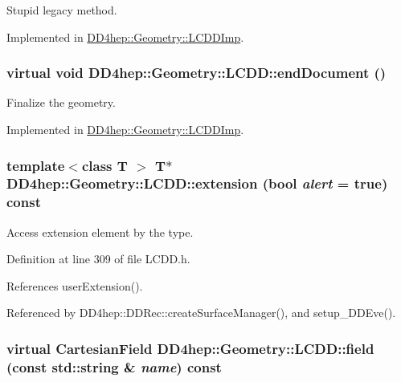 Stupid legacy method. 

Implemented in \hyperlink{class_d_d4hep_1_1_geometry_1_1_l_c_d_d_imp_ad50f1540a6b3d99e049e1e4a91eabf8a}{DD4hep::Geometry::LCDDImp}.\hypertarget{class_d_d4hep_1_1_geometry_1_1_l_c_d_d_abe2147b8363040ce95bb40f810d95b36}{
\subsubsection[{endDocument}]{\setlength{\rightskip}{0pt plus 5cm}virtual void DD4hep::Geometry::LCDD::endDocument ()}}
\label{class_d_d4hep_1_1_geometry_1_1_l_c_d_d_abe2147b8363040ce95bb40f810d95b36}


Finalize the geometry. 

Implemented in \hyperlink{class_d_d4hep_1_1_geometry_1_1_l_c_d_d_imp_aa3fa37aa7608b67f95aa644dc381389f}{DD4hep::Geometry::LCDDImp}.\hypertarget{class_d_d4hep_1_1_geometry_1_1_l_c_d_d_aac5486912a4f88cbad59f6e0ec137289}{
\subsubsection[{extension}]{\setlength{\rightskip}{0pt plus 5cm}template$<$class T $>$ {\bf T}$\ast$ DD4hep::Geometry::LCDD::extension (bool {\em alert} = {\ttfamily true}) const}}
\label{class_d_d4hep_1_1_geometry_1_1_l_c_d_d_aac5486912a4f88cbad59f6e0ec137289}


Access extension element by the type. 

Definition at line 309 of file LCDD.h.

References userExtension().

Referenced by DD4hep::DDRec::createSurfaceManager(), and setup\_\-DDEve().\hypertarget{class_d_d4hep_1_1_geometry_1_1_l_c_d_d_adcc7929860f5ac592d8f4c2d476555e9}{
\subsubsection[{field}]{\setlength{\rightskip}{0pt plus 5cm}virtual {\bf CartesianField} DD4hep::Geometry::LCDD::field (const std::string \& {\em name}) const}}
\label{class_d_d4hep_1_1_geometry_1_1_l_c_d_d_adcc7929860f5ac592d8f4c2d476555e9}


